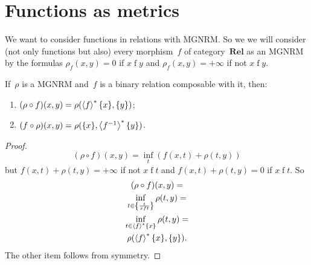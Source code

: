 
\section{Functions as metrics}

We want to consider functions in relations with MGNRM. So we we will consider (not only functions but also) every morphism~$f$ of category~$\mathbf{Rel}$ as an MGNRM by the formulas $\rho_{f}(x,y) = 0$ if $x\mathrel{f}y$ and $\rho_{f}(x,y) = +\infty$ if not $x\mathrel{f}y$.


\begin{thm}
If~$\rho$ is a MGNRM and~$f$ is a binary relation composable with it, then:
\begin{enumerate}
\item $(\rho\circ f)(x,y) = \rho(\left\langle f\right\rangle ^{\ast}\{x\},\{y\})$;
\item $(f\circ\rho)(x,y) = \rho(\{x\},\left\langle f^{-1}\right\rangle ^{\ast}\{y\})$.
\end{enumerate}
\end{thm}

\begin{proof}
~
\[
(\rho\circ f)(x,y) = \inf_{t}(f(x,t) + \rho(t,y))
\]
but $f(x,t) + \rho(t,y) = +\infty$ if not $x\mathrel{f}t$ and $f(x,t) + \rho(t,y) = 0$ if $x\mathrel{f}t$. So
\begin{multline*}
(\rho\circ f)(x,y) = \\
\inf_{t\in\left\{ \frac{t}{x\mathrel{f}t}\right\}}\rho(t,y) = \\
\inf_{t\in\left\langle f\right\rangle ^{\ast}\{x\}}\rho(t,y) = \\
\rho(\left\langle f\right\rangle ^{\ast}\{x\},\{y\}).
\end{multline*}
The other item follows from symmetry.
\end{proof}

